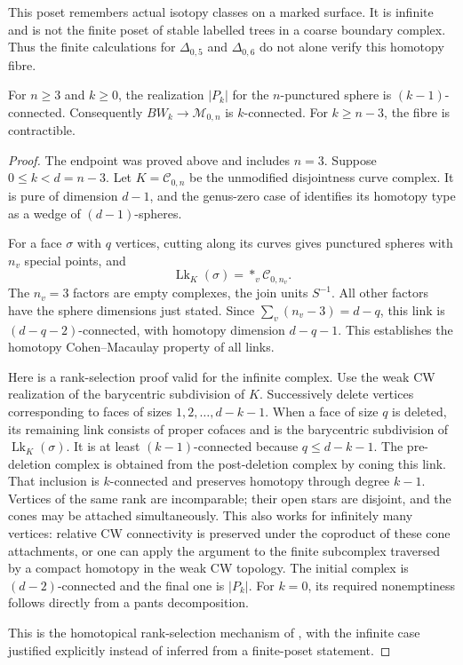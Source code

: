 This poset remembers actual isotopy classes on a marked surface.
It is infinite and is not the finite poset of stable labelled
trees in a coarse boundary complex. Thus the finite calculations
for \(\Delta_{0,5}\) and \(\Delta_{0,6}\) do not alone verify this
homotopy fibre.

\begin{theorem}\label{P5b2}
For \(n\geq3\) and \(k\geq0\), the realization \(|P_k|\) for the
\(n\)-punctured sphere is \((k-1)\)-connected.
Consequently \(BW_k\to\mathcal M_{0,n}\) is \(k\)-connected.
For \(k\geq n-3\), the fibre is contractible.
\end{theorem}

\begin{proof}
The endpoint was proved above and includes \(n=3\).
Suppose \(0\leq k<d=n-3\). Let \(K=\mathcal C_{0,n}\) be the
unmodified disjointness curve complex. It is pure of dimension
\(d-1\), and the genus-zero case of
\citet[Chapter 4, Theorem 4.1]{Harer1988} identifies its homotopy
type as a wedge of \((d-1)\)-spheres.

For a face \(\sigma\) with \(q\) vertices, cutting along its curves
gives punctured spheres with \(n_v\) special points, and
\[
              \operatorname{Lk}_{K}(\sigma)
                       =\mathop{*}_{v}\mathcal C_{0,n_v}.
\]
The \(n_v=3\) factors are empty complexes, the join units \(S^{-1}\).
All other factors have the sphere dimensions just stated.
Since \(\sum_v(n_v-3)=d-q\), this link is
\((d-q-2)\)-connected, with homotopy dimension \(d-q-1\).
This establishes the homotopy Cohen--Macaulay property of all links.

Here is a rank-selection proof valid for the infinite complex.
Use the weak CW realization of the barycentric subdivision of \(K\).
Successively delete vertices corresponding to faces of sizes
\(1,2,\ldots,d-k-1\). When a face of size \(q\) is deleted, its
remaining link consists of proper cofaces and is the barycentric
subdivision of \(\operatorname{Lk}_{K}(\sigma)\). It is at least
\((k-1)\)-connected because \(q\leq d-k-1\).
The pre-deletion complex is obtained from the post-deletion complex
by coning this link. That inclusion is \(k\)-connected and
preserves homotopy through degree \(k-1\).
Vertices of the same rank are incomparable; their open stars are
disjoint, and the cones may be attached simultaneously.
This also works for infinitely many vertices: relative CW
connectivity is preserved under the coproduct of these cone
attachments, or one can apply the argument to the finite
subcomplex traversed by a compact homotopy in the weak CW topology.
The initial complex is \((d-2)\)-connected and the final one is
\(|P_k|\). For \(k=0\), its required nonemptiness follows directly
from a pants decomposition.

This is the homotopical rank-selection mechanism of
\citet[Corollary 4.4]{BjornerWachsWelker2009}, with the infinite
case justified explicitly instead of inferred from a finite-poset
statement.
\end{proof}

